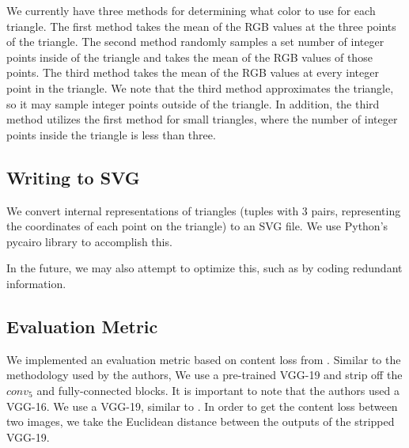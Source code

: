 We currently have three methods for determining what color to use for each triangle. The first method takes the mean of the RGB values at the three points of the triangle. The second method randomly samples a set number of integer points inside of the triangle and takes the mean of the RGB values of those points. The third method takes the mean of the RGB values at every integer point in the triangle. We note that the third method approximates the triangle, so it may sample integer points outside of the triangle. In addition, the third method utilizes the first method for small triangles, where the number of integer points inside the triangle is less than three.

\subsection{Writing to SVG}

We convert internal representations of triangles (tuples with 3 pairs, representing the coordinates of each point on the triangle) to an SVG file. We use Python's pycairo library to accomplish this.

In the future, we may also attempt to optimize this, such as by coding redundant information.

\subsection{Evaluation Metric}

We implemented an evaluation metric based on content loss from . Similar to the methodology used by the authors, We use a pre-trained VGG-19 and strip off the $conv_5$ and fully-connected blocks. It is important to note that the authors used a VGG-16. We use a VGG-19, similar to . In order to get the content loss between two images, we take the Euclidean distance between the outputs of the stripped VGG-19.



